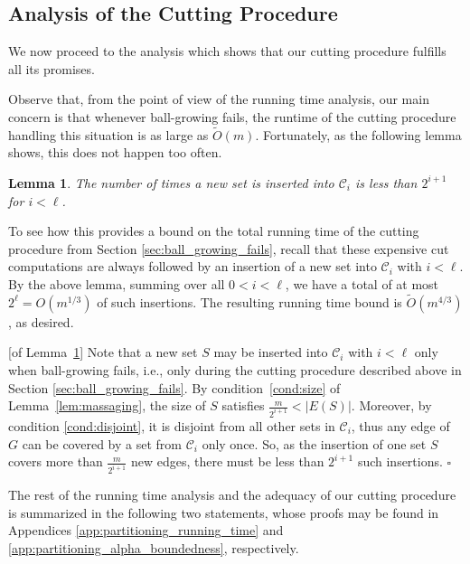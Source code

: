 \documentclass[11pt, letterpaper]{article}
\newtheorem{lemma}[theorem]{Lemma}
\newenvironment{proof}{\noindent{\bf Proof:}\hspace*{1em}}{\qed\bigskip}
\newcommand{\qed}{\hfill\ensuremath{\square}}
\newcommand{\cC}{\mathcal{C}}
\newcommand{\tO}{\widetilde{O}}
\begin{document}
\subsection{Analysis of the Cutting Procedure}

We now proceed to the analysis which shows that our cutting procedure fulfills all its promises.

Observe that, from the point of view of the running time analysis, our main concern is that whenever ball-growing fails, the runtime of the cutting procedure handling this situation is as large as $\tO(m)$. Fortunately, as the following lemma shows, this does not happen too often. 

\begin{lemma} \label{lem:number_of_insertions}
The number of times a new set is inserted into $\cC_i$ is less than $2^{i+1}$ for $i < \ell$.
\label{lem:number_of_insertions_of_set}
\end{lemma}

To see how this provides a bound on the total running time of the cutting procedure from Section \ref{sec:ball_growing_fails}, recall that these expensive cut computations are always followed by an insertion of a new set into $\cC_i$ with $i < \ell$. By the above lemma, summing over all $0<i<\ell$, we have a total of at most $2^{\ell}=O(m^{1/3})$ of such insertions. The resulting running time bound is $\tO(m^{4/3})$, as desired.

\begin{proof}[of Lemma~\ref{lem:number_of_insertions}]
Note that a new set $S$ may be inserted into $\cC_i$ with $i < \ell$ only when ball-growing fails, i.e., only during the cutting procedure described above in Section \ref{sec:ball_growing_fails}. By condition~\eqref{cond:size} of Lemma~\ref{lem:massaging}, the size of $S$ satisfies $\frac{m}{2^{i+1}} < |E(S)|$. Moreover, by condition \eqref{cond:disjoint}, it is disjoint from all other sets in $\cC_i$, thus any edge of $G$ can be covered by a set from $\cC_i$ only once. So, as the insertion of one set $S$ covers more than $\frac{m}{2^{i+1}}$ new edges, there must be less than $2^{i+1}$ such insertions.
\end{proof}

The rest of the running time analysis and the adequacy of our cutting procedure is summarized in the following two statements, whose proofs may be found in Appendices \ref{app:partitioning_running_time} and \ref{app:partitioning_alpha_boundedness}, respectively.
\end{document}

